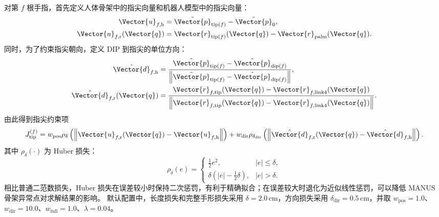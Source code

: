 对第 $f$ 根手指，首先定义人体骨架中的指尖向量和机器人模型中的指尖向量：
\begin{align}
    \Vector{u}_{f,\mathrm{h}} &=
    \tilde{\Vector{p}}_{\mathrm{tip}(f)}-\tilde{\Vector{p}}_0, \\
    \Vector{u}_{f,\mathrm{r}}(\Vector{q}) &=
    \Vector{r}_{\mathrm{tip}(f)}(\Vector{q})-
    \Vector{r}_{\mathrm{palm}}(\Vector{q}) .
\end{align}
同时，为了约束指尖朝向，定义 DIP 到指尖的单位方向：
\begin{align}
    \hat{\Vector{d}}_{f,\mathrm{h}} &=
    \frac{
        \tilde{\Vector{p}}_{\mathrm{tip}(f)}-
        \tilde{\Vector{p}}_{\mathrm{dip}(f)}
    }{
        \left\|
        \tilde{\Vector{p}}_{\mathrm{tip}(f)}-
        \tilde{\Vector{p}}_{\mathrm{dip}(f)}
        \right\|
    }, \\
    \hat{\Vector{d}}_{f,\mathrm{r}}(\Vector{q}) &=
    \frac{
        \Vector{r}_{f,\mathrm{tip}}(\Vector{q})-
        \Vector{r}_{f,\mathrm{link4}}(\Vector{q})
    }{
        \left\|
        \Vector{r}_{f,\mathrm{tip}}(\Vector{q})-
        \Vector{r}_{f,\mathrm{link4}}(\Vector{q})
        \right\|
    } .
\end{align}
由此得到指尖约束项
\begin{equation}
    J_{\mathrm{tip}}^{(f)} =
    w_{\mathrm{pos}}\rho_{\delta}
    \left(
        \left\|
        \Vector{u}_{f,\mathrm{r}}(\Vector{q})-
        \Vector{u}_{f,\mathrm{h}}
        \right\|
    \right)
    +
    w_{\mathrm{dir}}\rho_{\delta_{\mathrm{dir}}}
    \left(
        \left\|
        \hat{\Vector{d}}_{f,\mathrm{r}}(\Vector{q})-
        \hat{\Vector{d}}_{f,\mathrm{h}}
        \right\|
    \right).
\end{equation}
其中 $\rho_\delta(\cdot)$ 为 Huber 损失：
\begin{equation}
    \rho_\delta(e)=
    \begin{cases}
        \frac{1}{2}e^2, & |e|\le\delta,\\
        \delta\left(|e|-\frac{1}{2}\delta\right), & |e|>\delta .
    \end{cases}
\end{equation}
相比普通二范数损失，Huber 损失在误差较小时保持二次惩罚，有利于精确拟合；在误差较大时退化为近似线性惩罚，可以降低 MANUS 骨架异常点对求解结果的影响。
默认配置中，长度损失和完整手形损失采用 $\delta=2.0\,\mathrm{cm}$，方向损失采用 $\delta_{\mathrm{dir}}=0.5\,\mathrm{cm}$，并取 $w_{\mathrm{pos}}=1.0$、$w_{\mathrm{dir}}=10.0$、$w_{\mathrm{full}}=1.0$、$\lambda=0.04$。

